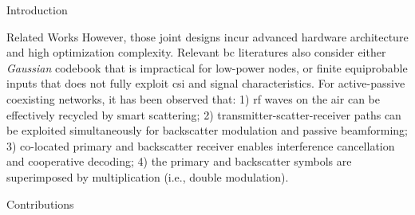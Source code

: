 \documentclass[journal]{IEEEtran}
\begin{document}
\begin{section}{Introduction}
\begin{subsection}{Related Works}
		However, those joint designs incur advanced hardware architecture and high optimization complexity.
		Relevant \gls{bc} literatures also consider either \emph{Gaussian} codebook \cite{Guo2019b,Ding2020,Long2020a,Zhou2019a,Wu2021a,Xu2021a,Yang2021a,Hu2021b} that is impractical for low-power nodes, or finite equiprobable inputs \cite{Yang2018,Liang2020,Han2021,Zhang2022,Liu2019d,Bereyhi2020,Xu2020b,Zhang2021d,Hua2022,Basar2020,Ma2020a,Yuan2021,Hu2021a} that does not fully exploit \gls{csi} and signal characteristics.
		For active-passive coexisting networks, it has been observed that:
		1) \gls{rf} waves on the air can be effectively recycled by smart scattering;
		2) transmitter-scatter-receiver paths can be exploited simultaneously for backscatter modulation and passive beamforming;
		3) co-located primary and backscatter receiver enables interference cancellation and cooperative decoding;
		4) the primary and backscatter symbols are superimposed by multiplication (i.e., double modulation).
	\end{subsection}

	\begin{subsection}{Contributions}




\end{subsection}
\end{section}
\end{document}
